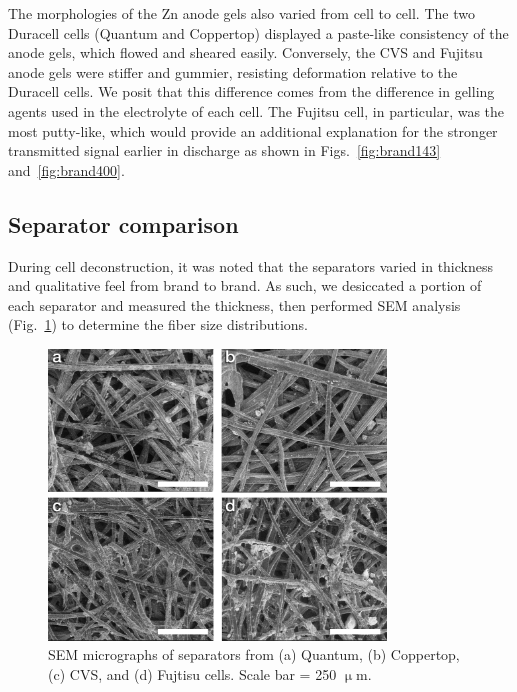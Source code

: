 The morphologies of the Zn anode gels also varied from cell to cell. The two Duracell cells (Quantum and Coppertop) displayed a paste-like consistency of the anode gels, which flowed and sheared easily. Conversely, the CVS and Fujitsu anode gels were stiffer and gummier, resisting deformation relative to the Duracell cells. We posit that this difference comes from the difference in gelling agents used in the electrolyte of each cell. The Fujitsu cell, in particular, was the most putty-like, which would provide an additional explanation for the stronger transmitted signal earlier in discharge as shown in Figs.~\ref{fig:brand143} and~\ref{fig:brand400}.

\subsection{Separator comparison}

During cell deconstruction, it was noted that the separators varied in thickness and qualitative feel from brand to brand. As such, we desiccated a portion of each separator and measured the thickness, then performed SEM analysis (Fig.~\ref{fig:seps}) to determine the fiber size distributions. 

\begin{figure}[htb]
  \centering
    \includegraphics[width=0.8\textwidth]{ch5-alkbw/images/Seps.png}
    \caption[SEM micrographs of separators from multiple brands of alkaline AA batteries.]{SEM micrographs of separators from (a) Quantum, (b) Coppertop, (c) CVS, and (d) Fujtisu cells. Scale bar = 250 $\upmu$m.}
    \label{fig:seps}
\end{figure}

